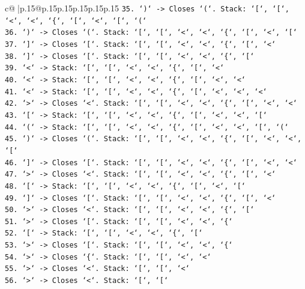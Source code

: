 \documentclass{article}
\begin{document}
{\begin{supertabular}{c@{$\;$}|p{.15\linewidth}@{}p{.15\linewidth}p{.15\linewidth}p{.15\linewidth}p{.15\linewidth}p{.15\linewidth}}
{{{\texttt{35. `)` {-}> Closes `(`. Stack: `{[}`, `{[}`, `<`, `<`, `\{`, `{[}`, `<`, `{[}`, `(`} \\
\texttt{36. `)` {-}> Closes `(`. Stack: `{[}`, `{[}`, `<`, `<`, `\{`, `{[}`, `<`, `{[}`} \\
\texttt{37. `{]}` {-}> Closes `{[}`. Stack: `{[}`, `{[}`, `<`, `<`, `\{`, `{[}`, `<`} \\
\texttt{38. `{]}` {-}> Closes `{[}`. Stack: `{[}`, `{[}`, `<`, `<`, `\{`, `{[}`} \\
\texttt{39. `<` {-}> Stack: `{[}`, `{[}`, `<`, `<`, `\{`, `{[}`, `<`} \\
\texttt{40. `<` {-}> Stack: `{[}`, `{[}`, `<`, `<`, `\{`, `{[}`, `<`, `<`} \\
\texttt{41. `<` {-}> Stack: `{[}`, `{[}`, `<`, `<`, `\{`, `{[}`, `<`, `<`, `<`} \\
\texttt{42. `>` {-}> Closes `<`. Stack: `{[}`, `{[}`, `<`, `<`, `\{`, `{[}`, `<`, `<`} \\
\texttt{43. `{[}` {-}> Stack: `{[}`, `{[}`, `<`, `<`, `\{`, `{[}`, `<`, `<`, `{[}`} \\
\texttt{44. `(` {-}> Stack: `{[}`, `{[}`, `<`, `<`, `\{`, `{[}`, `<`, `<`, `{[}`, `(`} \\
\texttt{45. `)` {-}> Closes `(`. Stack: `{[}`, `{[}`, `<`, `<`, `\{`, `{[}`, `<`, `<`, `{[}`} \\
\texttt{46. `{]}` {-}> Closes `{[}`. Stack: `{[}`, `{[}`, `<`, `<`, `\{`, `{[}`, `<`, `<`} \\
\texttt{47. `>` {-}> Closes `<`. Stack: `{[}`, `{[}`, `<`, `<`, `\{`, `{[}`, `<`} \\
\texttt{48. `{[}` {-}> Stack: `{[}`, `{[}`, `<`, `<`, `\{`, `{[}`, `<`, `{[}`} \\
\texttt{49. `{]}` {-}> Closes `{[}`. Stack: `{[}`, `{[}`, `<`, `<`, `\{`, `{[}`, `<`} \\
\texttt{50. `>` {-}> Closes `<`. Stack: `{[}`, `{[}`, `<`, `<`, `\{`, `{[}`} \\
\texttt{51. `>` {-}> Closes `{[}`. Stack: `{[}`, `{[}`, `<`, `<`, `\{`} \\
\texttt{52. `{[}` {-}> Stack: `{[}`, `{[}`, `<`, `<`, `\{`, `{[}`} \\
\texttt{53. `>` {-}> Closes `{[}`. Stack: `{[}`, `{[}`, `<`, `<`, `\{`} \\
\texttt{54. `>` {-}> Closes `\{`. Stack: `{[}`, `{[}`, `<`, `<`} \\
\texttt{55. `>` {-}> Closes `<`. Stack: `{[}`, `{[}`, `<`} \\
\texttt{56. `>` {-}> Closes `<`. Stack: `{[}`, `{[}`} \\
}}}
\end{supertabular}}
\end{document}
